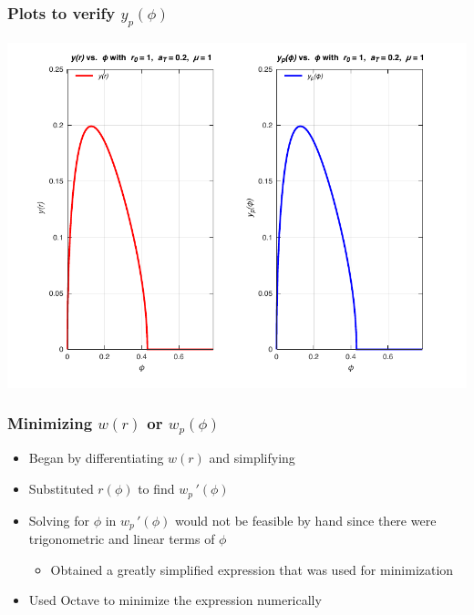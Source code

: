 \documentclass{beamer}
\begin{document}
\begin{frame}
    \frametitle{Plots to verify $y_p(\phi)$}

    \begin{center}
        \includegraphics[scale=0.7]{plots/partB.pdf}
    \end{center}
\end{frame}

\begin{frame}
    \frametitle{Minimizing $w(r)$ or $w_p(\phi)$}

    \begin{itemize}
        \item Began by differentiating $w(r)$ and simplifying
        \item Substituted $r(\phi)$ to find $w_p\,'(\phi)$
        \item Solving for $\phi$ in $w_p\,'(\phi)$ would not be feasible by hand since there were trigonometric and linear terms of $\phi$
        \begin{itemize}
            \item Obtained a greatly simplified expression that was used for minimization
        \end{itemize}
        \item Used Octave to minimize the expression numerically
    \end{itemize}

\end{frame}
\end{document}
